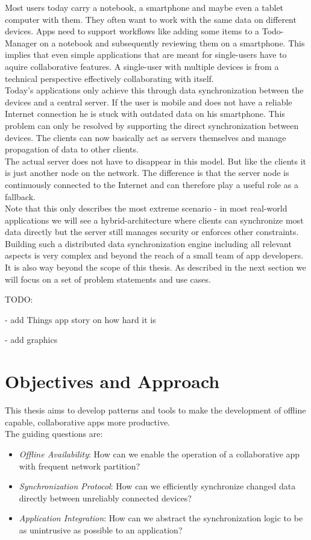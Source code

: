 Most users today carry a notebook, a smartphone and maybe even a tablet computer with them.
They often want to work with the same data on different devices.
Apps need to support workflows like adding some items to a Todo-Manager on a notebook and subsequently reviewing them on a smartphone.
This implies that even simple applications that are meant for single-users have to aquire collaborative features.
A single-user with multiple devices is from a technical perspective effectively collaborating with itself.\\
Today's applications only achieve this through  data synchronization between the devices and a central server.
If the user is mobile and does not have a reliable Internet connection he is stuck with outdated data on his smartphone.
This problem can only be resolved by supporting the direct synchronization between devices.
The clients can now basically act as servers themselves and manage propagation of data to other clients.\\
The actual server does not have to disappear in this model.
But like the clients it is just another node on the network.
The difference is that the server node is continuously connected to the Internet and can therefore play a useful role as a fallback.\\
Note that this only describes the most extreme scenario - in most real-world applications we will see a hybrid-architecture where clients can synchronize most data directly but the server still manages security or enforces other constraints.\\
Building such a distributed data synchronization engine including all relevant aspects is very complex and beyond the reach of a small team of app developers.
It is also way beyond the scope of this thesis.
As described in the next section we will focus on a set of problem statements and use cases.

TODO:

- add Things app story on how hard it is

- add graphics

\section{Objectives and Approach}

This thesis aims to develop patterns and tools to make the development of offline capable, collaborative apps more productive.\\

The guiding questions are:
\begin{itemize}
\item \emph{Offline Availability}: How can we enable the operation of a collaborative app with frequent network partition?
\item \emph{Synchronization Protocol}: How can we efficiently synchronize changed data directly between unreliably connected devices?
\item \emph{Application Integration}: How can we abstract the synchronization logic to be as unintrusive as possible to an application?\\
\end{itemize}


